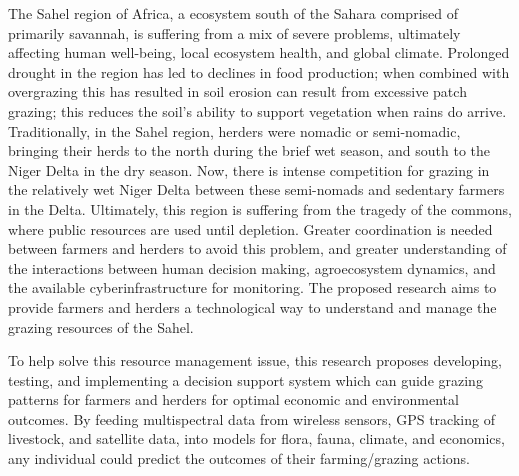 

The Sahel region of Africa, a ecosystem south of the Sahara comprised of primarily savannah, is suffering from a mix of severe problems, ultimately affecting human well-being, local ecosystem health, and global climate. Prolonged drought in the region has led to declines in food production; when combined with overgrazing this has resulted in soil erosion can result from excessive patch grazing; this reduces the soil's ability to support vegetation when rains do arrive. Traditionally, in the Sahel region, herders were nomadic or semi-nomadic, bringing their herds to the north during the brief wet season, and south to the Niger Delta in the dry season. Now, there is intense competition for grazing in the relatively wet Niger Delta between these semi-nomads and sedentary farmers in the Delta. Ultimately, this region is suffering from the tragedy of the commons, where public resources are used until depletion. Greater coordination is needed between farmers and herders to avoid this problem, and greater understanding of the interactions between human decision making, agroecosystem dynamics, and the available cyberinfrastructure for monitoring. The proposed research aims to provide farmers and herders a technological way to understand and manage the grazing resources of the Sahel.

To help solve this resource management issue, this research proposes developing, testing, and implementing a decision support system which can guide grazing patterns for farmers and herders for optimal economic and environmental outcomes. By feeding multispectral data from  wireless sensors, GPS tracking of livestock, and satellite data, into models for flora, fauna, climate, and economics, any individual could predict the outcomes of their farming/grazing actions. 

